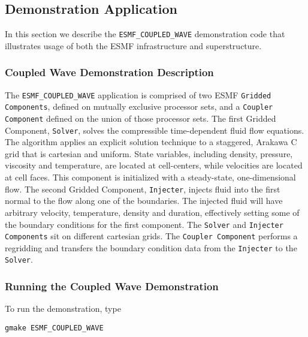 \subsection{Demonstration Application}
\label{sec:demo}

In this section we describe the {\tt ESMF\_COUPLED\_WAVE} demonstration 
code that illustrates usage of both the ESMF infrastructure and superstructure. 
\subsubsection{Coupled Wave Demonstration Description}

The {\tt ESMF\_COUPLED\_WAVE} application is comprised of two ESMF 
{\tt Gridded Components}, defined on mutually exclusive processor sets, 
and a {\tt Coupler Component} defined on the union of those processor sets.  
The first Gridded Component, {\tt Solver}, solves the compressible 
time-dependent fluid flow equations.  The algorithm 
applies an explicit solution technique to a staggered, Arakawa C grid 
that is cartesian and uniform.  State variables, including density, 
pressure, viscosity and temperature, are located at cell-centers, while 
velocities are located at cell faces.  This component is initialized 
with a steady-state, one-dimensional flow.  The second Gridded Component, 
{\tt Injecter}, injects fluid into the first normal to the flow along 
one of the boundaries.  The injected fluid will have arbitrary velocity, 
temperature, density and duration, effectively setting some of 
the boundary conditions for the first component.  The {\tt Solver} and 
{\tt Injecter Components} sit on different cartesian grids.  The
{\tt Coupler Component} performs a regridding and transfers the 
boundary condition data from the {\tt Injecter} to the {\tt Solver}.

\subsubsection{Running the Coupled Wave Demonstration}

To run the demonstration, type 

\begin{verbatim}
gmake ESMF_COUPLED_WAVE
\end{verbatim}






























